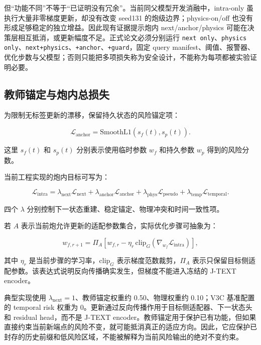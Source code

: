 \documentclass[11pt,a4paper]{article}
\newcommand{\code}[1]{\texttt{\small #1}}
\begin{document}
但“功能不同”不等于“已证明没有冗余”。当前同父模型开发消融中，intra-only 虽执行大量非零梯度更新，却没有改变 seed131 的炮级边界；physics-on/off 也没有形成足够稳定的独立增益。因此现有证据提示炮内 next/anchor/physics 可能在决策层相互抵消，或更新幅度不足。正式论文必须分别运行 \code{next only}、\code{physics only}、\code{next+physics}、\code{+anchor}、\code{+guard}，固定 query manifest、阈值、报警器、优化步数与父模型；否则只能把多项损失称为安全设计，不能称为每项都被实验证明必要。

\subsection{教师锚定与炮内总损失}

为限制无标签更新的漂移，保留持久状态的风险锚定项：

\begin{equation}
\mathcal{L}_{\mathrm{anchor}}
=\mathrm{SmoothL1}
(s_f(t),s_p(t)).
\label{eq:anchor-loss}
\end{equation}

这里 \(s_f(t)\) 和 \(s_p(t)\) 分别表示使用临时参数 \(w_f\) 和持久参数 \(w_p\) 得到的风险分数。

当前工程实现的炮内目标可写为：

\begin{equation}
\mathcal{L}_{\mathrm{intra}}
=\lambda_{\mathrm{next}}\mathcal{L}_{\mathrm{next}}
 +\lambda_{\mathrm{anchor}}\mathcal{L}_{\mathrm{anchor}}
 +\lambda_{\mathrm{phys}}\mathcal{L}_{\mathrm{pseudo}}
 +\lambda_{\mathrm{temp}}\mathcal{L}_{\mathrm{temporal}}.
\label{eq:intra-loss}
\end{equation}

四个 \(\lambda\) 分别控制下一状态重建、稳定锚定、物理冲突和时间一致性项。

若 \(A\) 表示当前炮允许更新的适配参数集合，实际优化步骤可抽象为：

\begin{equation}
w_{f,r+1}
=\Pi_A
\left[
w_{f,r}
-\eta_r\,
\mathrm{clip}_{G}
\left(\nabla_{w_f}
\mathcal{L}_{\mathrm{intra}}\right)
\right],
\label{eq:intra-update}
\end{equation}

其中 \(\eta_r\) 是当前步骤的学习率，\(\mathrm{clip}_{G}\) 表示梯度范数裁剪，\(\Pi_A\) 表示只保留目标侧适配参数。该表达式说明反向传播确实发生，但梯度不能进入冻结的 J-TEXT encoder。

典型实现使用 \(\lambda_{\mathrm{next}}=1\)、教师锚定权重约 0.50、物理权重约 0.10；V3C 基准配置的 temporal risk 权重为 0。更新通过反向传播作用于目标侧适配器、下一状态头和 residual head，而不是 J-TEXT encoder。教师锚定用于保护已有功能，但如果直接约束当前新端点的风险不变，就可能抵消真正的适应方向。因此，它应保护已封存的历史前缀和低风险区域，不能被解释为当前风险输出的绝对不变约束。
\end{document}
